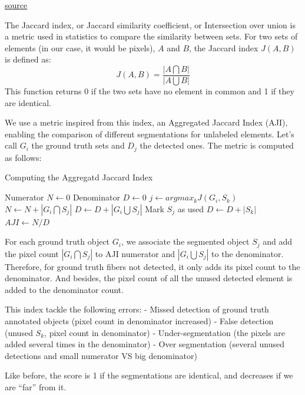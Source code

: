 \documentclass{report}
\begin{document}
\href{https://www.researchgate.net/publication/314271512_A_Dataset_and_a_Technique_for_Generalized_Nuclear_Segmentation_for_Computational_Pathology}{source}

The Jaccard index, or Jaccard similarity coefficient, or Intersection over union is a metric used in statistics to compare the similarity between sets.  
For two sets of elements (in our case, it would be pixels), $A$ and $B$, the Jaccard index $J(A,B)$ is defined as:
\[J(A,B)=\frac{|A\bigcap B|}{|A\bigcup B|}\]
This function returns 0 if the two sets have no element in common and 1 if they are identical. \newline

We use a metric inspired from this index, an Aggregated Jaccard Index (AJI), enabling the comparison of different segmentations for unlabeled elements.  
Let's call $G_i$ the ground truth sets and $D_j$ the detected ones. The metric is computed as follows:
\begin{algorithm}
\caption{Computing the Aggregatd Jaccard Index}
\begin{algorithmic} 
\STATE Numerator $N \leftarrow 0$
\STATE Denominator $D \leftarrow 0$
\STATE $j \leftarrow argmax_k J(G_i, S_k)$
\STATE $N \leftarrow N+|G_i\bigcap S_j|$
\STATE $D \leftarrow D+|G_i\bigcup S_j|$
\STATE Mark $S_j$ as used
\ENDFOR
{}
\STATE $D \leftarrow D + |S_k|$
\ENDIF
\ENDFOR
\STATE $AJI \leftarrow N/D$
\end{algorithmic}
\end{algorithm}

For each ground truth object $G_i$, we associate the segmented object $S_j$ and add the pixel count $|G_i\bigcap S_j|$ to AJI numerator and $|G_i\bigcup S_j|$ to the denominator.    
Therefore, for ground truth fibers not detected, it only adds its pixel count to the denominator.   
And besides, the pixel count of all the unused detected element is added to the denominator count. \newline

This index tackle the following errors:
- Missed detection of ground truth annotated objects (pixel count in denominator increased)
- False detection (unused $S_k$, pixel count in denominator)
- Under-segmentation (the pixels are added several times in the denominator)
- Over segmentation (several unused detections and small numerator VS big denominator)

Like before, the score is 1 if the segmentations are identical, and decreases if we are "`far"' from it.
\end{document}
